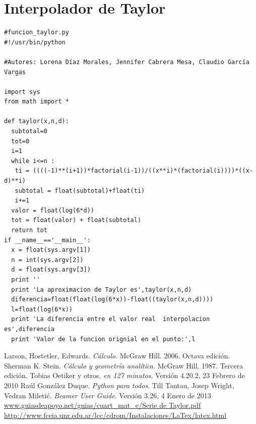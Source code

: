 \documentclass[a4paper,12pt]{report}
\begin{document}
\section{Interpolador de Taylor}
\begin{verbatim}
#funcion_taylor.py
#!/usr/bin/python

#Autores: Lorena Díaz Morales, Jennifer Cabrera Mesa, Claudio García Vargas

import sys
from math import *

def taylor(x,n,d):                                                                                                        
  subtotal=0                                                                                                              
  tot=0                                                                                                                   
  i=1                                                                                                                     
  while i<=n :                                                                                                            
   ti = ((((-1)**(i+1))*factorial(i-1))/((x**i)*(factorial(i))))*((x-d)**i)                                               
   subtotal = float(subtotal)+float(ti)                                                                                   
   i+=1                                                                                                                   
  valor = float(log(6*d))
  tot = float(valor) + float(subtotal)
  return tot
if __name__=='__main__':
  x = float(sys.argv[1])
  n = int(sys.argv[2])
  d = float(sys.argv[3])
  print ''
  print 'La aproximacion de Taylor es',taylor(x,n,d)
  diferencia=float(float(log(6*x))-float((taylor(x,n,d))))
  l=float(log(6*x))
  print 'La diferencia entre el valor real  interpolacion es',diferencia
  print 'Valor de la funcion orignial en el punto:',l
\end{verbatim}

\begin{thebibliography}{10}
Larson, Hostetler, Edwards. \emph{Cálculo}. McGraw Hill. 2006. Octava edición.
Sherman K. Stein. \emph{Cálculo y geometría analítica}. McGraw Hill. 1987. Tercera edición.
Tobias Oetiker y otros. \emph{\LaTeXe  en 127 minutos}. Versión 4.20.2, 23 Febrero de 2010
Raúl González Duque. \emph{Python para todos}.
Till Tantau, Josep Wright, Vedran Miletić. \emph{Beamer User Guide}. Versión 3.26, 4 Enero de 2013
\url{www.guiasdeapoyo.net/guias/cuart_mat_e/Serie de Taylor.pdf}
\url{http://www.fceia.unr.edu.ar/lcc/cdrom/Instalaciones/LaTex/latex.html}
\end{thebibliography}
\end{document}
